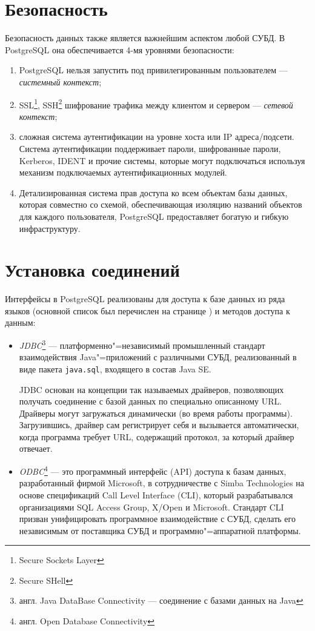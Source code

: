 \documentclass[a4paper,12pt,notitlepage,headsepline,pdftex]{scrartcl}
\begin{document}
  \pagebreak

\section{Безопасность}
  Безопасность данных также является важнейшим аспектом любой СУБД.
  В PostgreSQL она обеспечивается 4-мя уровнями безопасности:
  \begin{enumerate}
    \item PostgreSQL нельзя запустить под привилегированным пользователем ---
      \emph{системный контекст};
    \item SSL\footnote{Secure Sockets Layer}, SSH\footnote{Secure SHell}
      шифрование трафика между клиентом и сервером --- \emph{сетевой
      контекст};
    \item сложная система аутентификации на уровне хоста или IP
      адреса/подсети.
      Система аутентификации поддерживает пароли, шифрованные пароли,
      Kerberos, IDENT и прочие системы, которые могут подключаться используя
      механизм подключаемых аутентификационных модулей.
    \item Детализированная система прав доступа ко всем объектам базы данных,
      которая совместно со схемой, обеспечивающая изоляцию названий объектов
      для каждого пользователя, PostgreSQL предоставляет богатую и гибкую
      инфраструктуру.
  \end{enumerate}
  \pagebreak

\section{Установка соединений}
  Интерфейсы в PostgreSQL реализованы для доступа к базе данных из ряда языков
  (основной список был перечислен на странице \pageref{p:langs}) и методов
  доступа к данным:
  \begin{itemize}
    \item \emph{JDBC}\footnote{англ. Java DataBase Connectivity --- соединение
      с базами данных на Java} --- платформенно"=независимый промышленный
      стандарт взаимодействия Java"=приложений с различными СУБД,
      реализованный в виде пакета \verb'java.sql', входящего в состав Java SE.

      JDBC основан на концепции так называемых драйверов, позволяющих получать
      соединение с базой данных по специально описанному URL.
      Драйверы могут загружаться динамически (во время работы программы).
      Загрузившись, драйвер сам регистрирует себя и вызывается автоматически,
      когда программа требует URL, содержащий протокол, за который драйвер
      отвечает.
    \item \emph{ODBC}\footnote{англ. Open Database Connectivity} --- это
      программный интерфейс (API) доступа к базам данных, разработанный фирмой
      Microsoft, в сотрудничестве с Simba Technologies на основе спецификаций
      Call Level Interface (CLI), который разрабатывался организациями SQL
      Access Group, X/Open и Microsoft.
      Стандарт CLI призван унифицировать программное взаимодействие с СУБД,
      сделать его независимым от поставщика СУБД и программно"=аппаратной
      платформы.
  \end{itemize}
  \pagebreak
\end{document}
